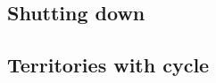 \documentclass[12pt,a4paper]{article}
\begin{document}
\subsection{Shutting down}

\subsection{Territories with cycle}





\end{document}
